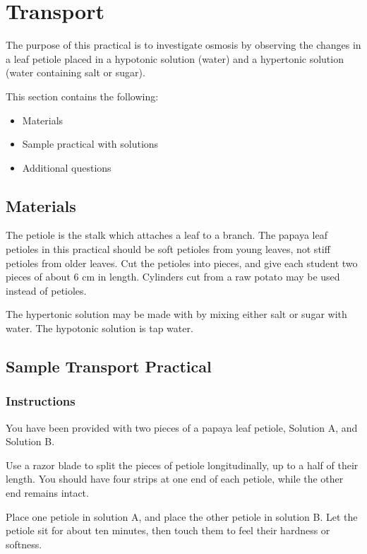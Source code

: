 \section{Transport}  

The purpose of this practical is to investigate osmosis by observing the changes in a leaf petiole placed in a hypotonic solution (water) and a hypertonic solution (water containing salt or sugar). 

This section contains the following:
\begin{itemize}
\item{Materials}
\item{Sample practical with solutions}
\item{Additional questions}
\end{itemize}

\subsection{Materials}
The petiole is the stalk which attaches a leaf to a branch. The papaya leaf petioles in this practical should be soft petioles from young leaves, not stiff petioles from older leaves. Cut the petioles into pieces, and give each student two pieces of about 6 cm in length. Cylinders cut from a raw potato  may be used instead of petioles.

The hypertonic solution may be made with by mixing either salt or sugar with water. The hypotonic solution is tap water.

\subsection{Sample Transport Practical}

\subsubsection{Instructions}

You have been provided with two pieces of a papaya leaf petiole, Solution A, and Solution B.
 
Use a razor blade to split the pieces of petiole longitudinally, up to a half of their length. You should have four strips at one end of each petiole, while the other end remains intact. 

Place one petiole in solution A, and place the other petiole in solution B. Let the petiole  sit for about ten minutes, then touch them to feel their hardness or softness.

